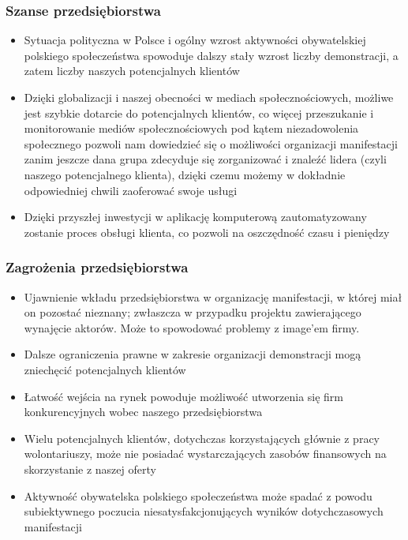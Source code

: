 \documentclass{article}
\begin{document}
\subsubsection{Szanse przedsiębiorstwa}
\begin{itemize}
\item Sytuacja polityczna w Polsce i ogólny wzrost aktywności obywatelskiej polskiego społeczeństwa spowoduje dalszy stały wzrost liczby demonstracji, a zatem liczby naszych potencjalnych klientów
\item Dzięki globalizacji i naszej obecności w mediach społecznościowych, możliwe jest szybkie dotarcie do potencjalnych klientów, co więcej przeszukanie i monitorowanie mediów społecznościowych pod kątem niezadowolenia społecznego pozwoli nam dowiedzieć się o możliwości organizacji manifestacji zanim jeszcze dana grupa zdecyduje się zorganizować i znaleźć lidera (czyli naszego potencjalnego klienta), dzięki czemu możemy w dokładnie odpowiedniej chwili zaoferować swoje usługi
\item Dzięki przyszłej inwestycji w aplikację komputerową zautomatyzowany zostanie proces obsługi klienta, co pozwoli na oszczędność czasu i pieniędzy
\end{itemize}
\subsubsection{Zagrożenia przedsiębiorstwa}
\begin{itemize}
\item Ujawnienie wkładu przedsiębiorstwa w organizację manifestacji, w której miał on pozostać nieznany; zwłaszcza w przypadku projektu zawierającego wynajęcie aktorów. Może to spowodować problemy z image'em firmy.
\item Dalsze ograniczenia prawne w zakresie organizacji demonstracji mogą zniechęcić potencjalnych klientów
\item Łatwość wejścia na rynek powoduje możliwość utworzenia się firm konkurencyjnych wobec naszego przedsiębiorstwa
\item Wielu potencjalnych klientów, dotychczas korzystających głównie z pracy wolontariuszy, może nie posiadać wystarczających zasobów finansowych na skorzystanie z naszej oferty
\item Aktywność obywatelska polskiego społeczeństwa może spadać z powodu subiektywnego poczucia niesatysfakcjonujących wyników dotychczasowych manifestacji
\end{itemize}
\end{document}
